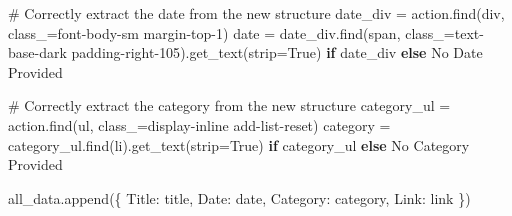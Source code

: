 \documentclass[
  letterpaper,
  DIV=11,
  numbers=noendperiod]{scrartcl}
\newenvironment{Shaded}{\begin{snugshade}}{\end{snugshade}}
\newcommand{\CommentTok}[1]{\textcolor[rgb]{0.37,0.37,0.37}{#1}}
\newcommand{\ControlFlowTok}[1]{\textcolor[rgb]{0.00,0.23,0.31}{\textbf{#1}}}
\newcommand{\NormalTok}[1]{\textcolor[rgb]{0.00,0.23,0.31}{#1}}
\newcommand{\OperatorTok}[1]{\textcolor[rgb]{0.37,0.37,0.37}{#1}}
\newcommand{\StringTok}[1]{\textcolor[rgb]{0.13,0.47,0.30}{#1}}
\newcommand{\VariableTok}[1]{\textcolor[rgb]{0.07,0.07,0.07}{#1}}
\begin{document}
\begin{Shaded}
\begin{Highlighting}[]
            \CommentTok{\# Correctly extract the date from the new structure}
\NormalTok{            date\_div }\OperatorTok{=}\NormalTok{ action.find(}\StringTok{\textquotesingle{}div\textquotesingle{}}\NormalTok{, class\_}\OperatorTok{=}\StringTok{\textquotesingle{}font{-}body{-}sm margin{-}top{-}1\textquotesingle{}}\NormalTok{)}
\NormalTok{            date }\OperatorTok{=}\NormalTok{ date\_div.find(}\StringTok{\textquotesingle{}span\textquotesingle{}}\NormalTok{, class\_}\OperatorTok{=}\StringTok{\textquotesingle{}text{-}base{-}dark padding{-}right{-}105\textquotesingle{}}\NormalTok{).get\_text(strip}\OperatorTok{=}\VariableTok{True}\NormalTok{) }\ControlFlowTok{if}\NormalTok{ date\_div }\ControlFlowTok{else} \StringTok{\textquotesingle{}No Date Provided\textquotesingle{}}
            
            \CommentTok{\# Correctly extract the category from the new structure}
\NormalTok{            category\_ul }\OperatorTok{=}\NormalTok{ action.find(}\StringTok{\textquotesingle{}ul\textquotesingle{}}\NormalTok{, class\_}\OperatorTok{=}\StringTok{\textquotesingle{}display{-}inline add{-}list{-}reset\textquotesingle{}}\NormalTok{)}
\NormalTok{            category }\OperatorTok{=}\NormalTok{ category\_ul.find(}\StringTok{\textquotesingle{}li\textquotesingle{}}\NormalTok{).get\_text(strip}\OperatorTok{=}\VariableTok{True}\NormalTok{) }\ControlFlowTok{if}\NormalTok{ category\_ul }\ControlFlowTok{else} \StringTok{\textquotesingle{}No Category Provided\textquotesingle{}}

\NormalTok{            all\_data.append(\{}
                \StringTok{\textquotesingle{}Title\textquotesingle{}}\NormalTok{: title,}
                \StringTok{\textquotesingle{}Date\textquotesingle{}}\NormalTok{: date,}
                \StringTok{\textquotesingle{}Category\textquotesingle{}}\NormalTok{: category,}
                \StringTok{\textquotesingle{}Link\textquotesingle{}}\NormalTok{: link}
\NormalTok{            \})}


\end{Highlighting}
\end{Shaded}
\end{document}
